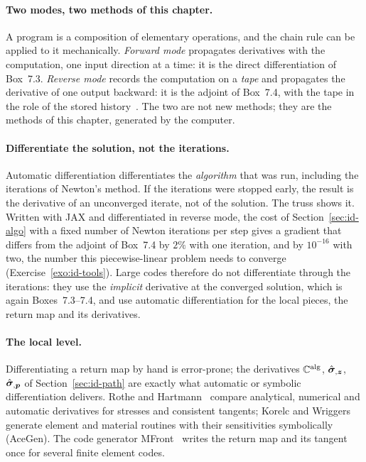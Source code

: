 \paragraph{Two modes, two methods of this chapter.}
A program is a composition of elementary operations, and the chain rule can be
applied to it mechanically. \emph{Forward mode} propagates derivatives with the
computation, one input direction at a time: it is the direct differentiation of
Box~7.3. \emph{Reverse mode} records the computation on a \emph{tape} and
propagates the derivative of one output backward: it is the adjoint of Box~7.4,
with the tape in the role of the stored history~\cite{GriewankWalther2008}. The
two are not new methods; they are the methods of this chapter, generated by the
computer.

\paragraph{Differentiate the solution, not the iterations.}
Automatic differentiation differentiates the \emph{algorithm} that was run,
including the iterations of Newton's method. If the iterations were stopped
early, the result is the derivative of an unconverged iterate, not of the
solution. The truss shows it. Written with JAX and differentiated in reverse mode,
the cost of Section~\ref{sec:id-algo} with a fixed number of Newton iterations per
step gives a gradient that differs from the adjoint of Box~7.4 by $2\%$ with one
iteration, and by $10^{-16}$ with two, the number this piecewise-linear problem
needs to converge (Exercise~\ref{exo:id-tools}). Large codes therefore do not
differentiate through the iterations: they use the \emph{implicit} derivative at
the converged solution, which is again Boxes~7.3--7.4, and use automatic
differentiation for the local pieces, the return map and its derivatives.

\paragraph{The local level.}
Differentiating a return map by hand is error-prone; the derivatives
$\mathbb{C}^{\mathrm{alg}}$, $\hat{\bm{\sigma}}_{,\bm{z}}$, $\hat{\bm{\sigma}}_{,\bm{p}}$ of Section~\ref{sec:id-path} are
exactly what automatic or symbolic differentiation delivers. Rothe and
Hartmann~\cite{RotheHartmann2015} compare analytical, numerical and automatic
derivatives for stresses and consistent tangents; Korelc and
Wriggers~\cite{KorelcWriggers2016} generate element and material routines with
their sensitivities symbolically (AceGen). The code generator
MFront~\cite{HelferEtAl2015} writes the return map and its tangent once for
several finite element codes.

